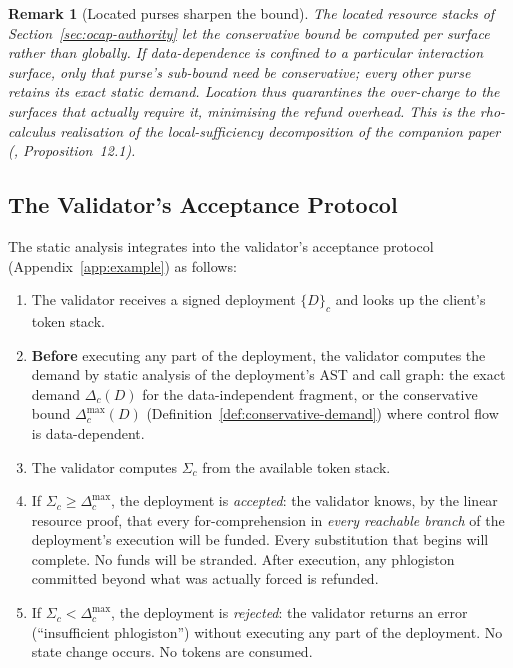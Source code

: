 \documentclass[11pt,a4paper]{article}
\newtheorem{remark}[theorem]{Remark}
\newcommand{\signed}[2]{\{#1\}_{#2}}
\begin{document}
\begin{remark}[Located purses sharpen the bound]
  The located resource stacks of
  Section~\ref{sec:ocap-authority} let the conservative bound
  be computed \emph{per surface} rather than globally.  If
  data-dependence is confined to a particular interaction
  surface, only that purse's sub-bound need be conservative;
  every other purse retains its exact static demand.  Location
  thus quarantines the over-charge to the surfaces that
  actually require it, minimising the refund overhead.  This
  is the rho-calculus realisation of the local-sufficiency
  decomposition of the companion paper
  (\cite{CostEndofunctor}, Proposition~12.1).
\end{remark}

\subsection{The Validator's Acceptance Protocol}
\label{sec:acceptance-protocol}

The static analysis integrates into the validator's acceptance
protocol (Appendix~\ref{app:example}) as follows:

\begin{enumerate}[nosep]
  \item The validator receives a signed deployment
    $\signed{D}{c}$ and looks up the client's token stack.
  \item \textbf{Before} executing any part of the deployment,
    the validator computes the demand by static analysis of
    the deployment's AST and call graph: the exact demand
    $\Delta_c(D)$ for the data-independent fragment, or the
    conservative bound $\Delta_c^{\max}(D)$
    (Definition~\ref{def:conservative-demand}) where control
    flow is data-dependent.
  \item The validator computes $\Sigma_c$ from the available
    token stack.
  \item If $\Sigma_c \geq \Delta_c^{\max}$, the deployment is
    \emph{accepted}: the validator knows, by the linear
    resource proof, that every for-comprehension in
    \emph{every reachable branch} of the deployment's
    execution will be funded.  Every substitution that begins
    will complete.  No funds will be stranded.  After
    execution, any phlogiston committed beyond what was
    actually forced is refunded.
  \item If $\Sigma_c < \Delta_c^{\max}$, the deployment is
    \emph{rejected}: the validator returns an error
    (``insufficient phlogiston'') without executing any part
    of the deployment.  No state change occurs.  No tokens
    are consumed.
\end{enumerate}
\end{document}

